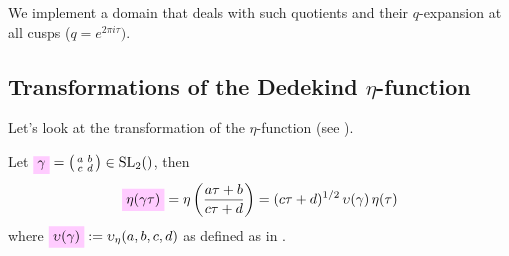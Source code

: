 \documentclass{article}
\begin{document}
We implement a domain that deals with such quotients and their
$q$-expansion at all cusps ($q=e^{2\pi i \tau})$.

\subsection{Transformations of the Dedekind $\eta$-function}


Let's look at the transformation of the $\eta$-function (see
\cite[Lemma~2.27]{Radu:PhD:2010}).

Let
$\defineNotation[gamma]{\gamma} =
\left(\begin{smallmatrix}a&b\\c&d\end{smallmatrix}\right) \in
\SL2Z$, then
\begin{gather}
\defineNotation[eta]{\eta(\gamma\tau)} =
\eta\left(\frac{a\tau+b}{c\tau+d}\right) =
(c\tau+d)^{1/2}\,\upsilon(\gamma)\,\eta(\tau)
\label{eq:eta-transformation}
\end{gather}
where
$\defineNotation[upsilon-gamma]{\upsilon(\gamma)} :=
\upsilon_\eta(a,b,c,d)$ as defined as in
\cite[Lemma~2.27]{Radu:PhD:2010}.
\end{document}
